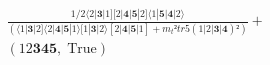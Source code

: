 \documentclass[varwidth, border=5pt]{standalone}
\begin{document}
\begin{my}
$\begin{gathered}
\scriptscriptstyle\frac{1/2⟨2|𝟑|1][2|𝟒|𝟓|2]⟨1|𝟓|𝟒|2⟩}{(⟨1|𝟑|2]⟨2|𝟒|𝟓|1⟩[1|𝟑|2⟩[2|𝟒|𝟓|1]+m_t²tr5(1|2|𝟑|𝟒)²)} +\\
\scriptscriptstyle(12𝟑𝟒𝟓,\;\text{True}) \phantom{+}
\end{gathered}$
\end{my}
\end{document}
